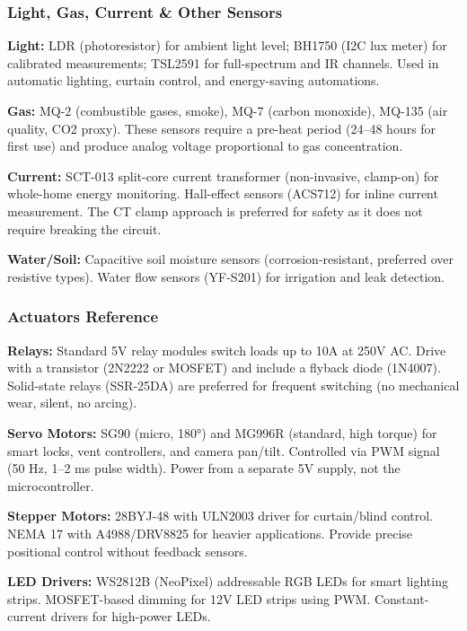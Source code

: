 \documentclass[11pt,letterpaper]{article}
\begin{document}
\subsubsection{Light, Gas, Current \& Other Sensors}

\textbf{Light:} LDR (photoresistor) for ambient light level; BH1750 (I2C lux meter) for calibrated measurements; TSL2591 for full-spectrum and IR channels. Used in automatic lighting, curtain control, and energy-saving automations.

\textbf{Gas:} MQ-2 (combustible gases, smoke), MQ-7 (carbon monoxide), MQ-135 (air quality, CO2 proxy). These sensors require a pre-heat period (24--48 hours for first use) and produce analog voltage proportional to gas concentration.

\textbf{Current:} SCT-013 split-core current transformer (non-invasive, clamp-on) for whole-home energy monitoring. Hall-effect sensors (ACS712) for inline current measurement. The CT clamp approach is preferred for safety as it does not require breaking the circuit.

\textbf{Water/Soil:} Capacitive soil moisture sensors (corrosion-resistant, preferred over resistive types). Water flow sensors (YF-S201) for irrigation and leak detection.

\subsubsection{Actuators Reference}

\textbf{Relays:} Standard 5V relay modules switch loads up to 10A at 250V AC. Drive with a transistor (2N2222 or MOSFET) and include a flyback diode (1N4007). Solid-state relays (SSR-25DA) are preferred for frequent switching (no mechanical wear, silent, no arcing).

\textbf{Servo Motors:} SG90 (micro, 180°) and MG996R (standard, high torque) for smart locks, vent controllers, and camera pan/tilt. Controlled via PWM signal (50 Hz, 1--2 ms pulse width). Power from a separate 5V supply, not the microcontroller.

\textbf{Stepper Motors:} 28BYJ-48 with ULN2003 driver for curtain/blind control. NEMA 17 with A4988/DRV8825 for heavier applications. Provide precise positional control without feedback sensors.

\textbf{LED Drivers:} WS2812B (NeoPixel) addressable RGB LEDs for smart lighting strips. MOSFET-based dimming for 12V LED strips using PWM. Constant-current drivers for high-power LEDs.
\end{document}
